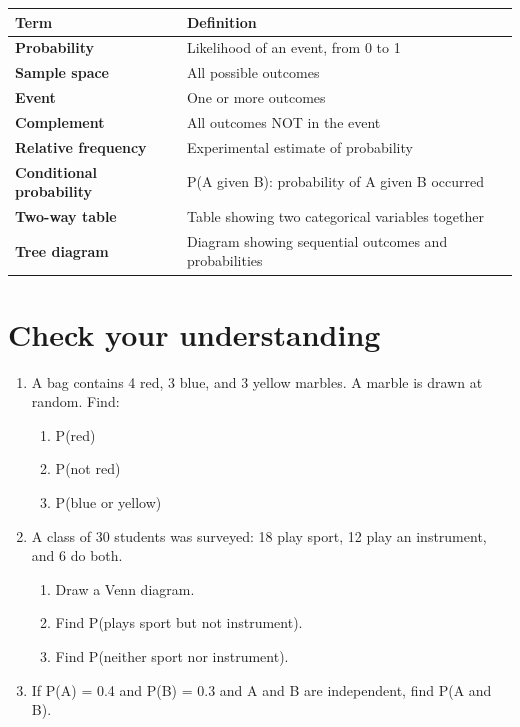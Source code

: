 \documentclass[
  11pt,
  a4paper,
  oneside,
  open=any]{scrbook}
\providecommand{\tightlist}{%
  \setlength{\itemsep}{0pt}\setlength{\parskip}{0pt}}
\begin{document}
\begin{longtable}[]{@{}
  >{\raggedright\arraybackslash}p{}
  >{\raggedright\arraybackslash}p{}@{}}
\toprule\noalign{}
\begin{minipage}[b]{\linewidth}\raggedright
Term
\end{minipage} & \begin{minipage}[b]{\linewidth}\raggedright
Definition
\end{minipage} \\
\midrule\noalign{}
\endhead
\bottomrule\noalign{}
\endlastfoot
\textbf{Probability} & Likelihood of an event, from 0 to 1 \\
\textbf{Sample space} & All possible outcomes \\
\textbf{Event} & One or more outcomes \\
\textbf{Complement} & All outcomes NOT in the event \\
\textbf{Relative frequency} & Experimental estimate of probability \\
\textbf{Conditional probability} & P(A given B): probability of A given
B occurred \\
\textbf{Two-way table} & Table showing two categorical variables
together \\
\textbf{Tree diagram} & Diagram showing sequential outcomes and
probabilities \\
\end{longtable}

\section{Check your understanding}\label{check-your-understanding-4}

\begin{enumerate}
\def\labelenumi{\arabic{enumi}.}
\tightlist
\item
  A bag contains 4 red, 3 blue, and 3 yellow marbles. A marble is drawn
  at random. Find:

  \begin{enumerate}
  \def\labelenumii{\alph{enumii}.}
  \tightlist
  \item
    P(red)
  \item
    P(not red)
  \item
    P(blue or yellow)
  \end{enumerate}
\item
  A class of 30 students was surveyed: 18 play sport, 12 play an
  instrument, and 6 do both.

  \begin{enumerate}
  \def\labelenumii{\alph{enumii}.}
  \tightlist
  \item
    Draw a Venn diagram.
  \item
    Find P(plays sport but not instrument).
  \item
    Find P(neither sport nor instrument).
  \end{enumerate}
\item
  If P(A) = 0.4 and P(B) = 0.3 and A and B are independent, find P(A and
  B).
\end{enumerate}
\end{document}

